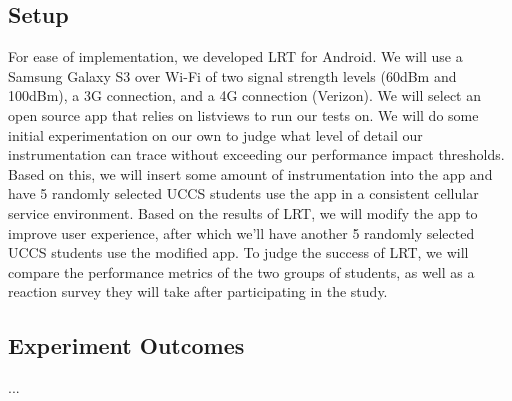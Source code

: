 \subsection{Setup}
For ease of implementation, we developed LRT for Android. We will use a Samsung Galaxy S3
over Wi-Fi of two signal strength levels (60dBm and 100dBm), a 3G connection, and a 4G connection
(Verizon). We will select an open source app that relies on listviews to run our tests on. We will
do some initial experimentation on our own to judge what level of detail our instrumentation can
trace without exceeding our performance impact thresholds. Based on this, we will insert some
amount of instrumentation into the app and have 5 randomly selected UCCS students use the app
in a consistent cellular service environment. Based on the results of LRT, we will modify the
app to improve user experience, after which we'll have another 5 randomly selected UCCS students
use the modified app. To judge the success of LRT, we will compare the performance metrics of the
two groups of students, as well as a reaction survey they will take after participating in the
study.

\subsection{Experiment Outcomes}
...



